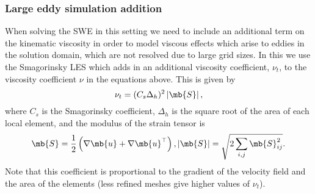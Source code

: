 \documentclass[11pt]{article}
\begin{document}
\subsubsection*{Large eddy simulation addition}

When solving the SWE in this setting we need to include an additional term on
the kinematic viscosity in order to model viscous effects which arise to eddies
in the solution domain, which are not resolved due to large grid sizes. In this
we use the Smagorinsky LES which adds in an additional viscosity coefficient,
$\nu_t$, to the viscosity coefficient $\nu$ in the equations above. This is
given by
\[
  \nu_t = (C_s \Delta_h)^2 \left| \mb{S} \right|,
\]
where $C_s$ is the Smagorinsky coefficient, $\Delta_h$ is the square root of the
area of each local element, and the modulus of the strain tensor is
\[
  \mb{S} = \frac{1}{2}\left( \nabla \mb{u} + \nabla \mb{u}^\top \right),
  \left| \mb{S} \right| = \sqrt{2 \sum_{i,j} \mb{S}_{ij}^2}.
\]
Note that this coefficient is proportional to the gradient of the velocity field
and the area of the elements (less refined meshes give higher values of $\nu_t$).







\end{document}
